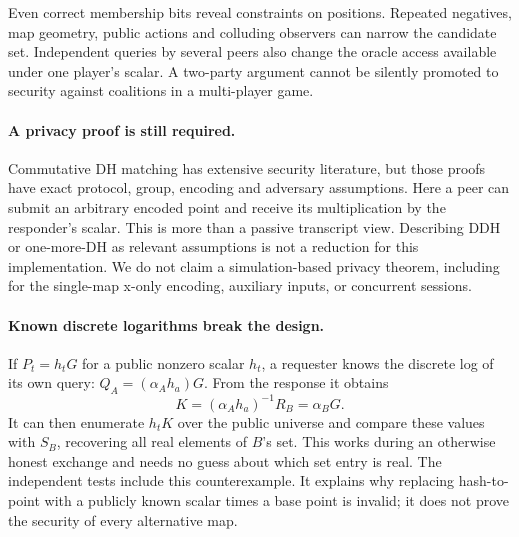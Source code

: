 \documentclass[11pt]{article}
\begin{document}
Even correct membership bits reveal constraints on positions. Repeated
negatives, map geometry, public actions and colluding observers can narrow the
candidate set. Independent queries by several peers also change the oracle
access available under one player's scalar. A two-party argument cannot be
silently promoted to security against coalitions in a multi-player game.

\paragraph{A privacy proof is still required.}
Commutative DH matching has extensive security literature, but those proofs
have exact protocol, group, encoding and adversary assumptions. Here a peer can
submit an arbitrary encoded point and receive its multiplication by the
responder's scalar. This is more than a passive transcript view. Describing
DDH or one-more-DH as relevant assumptions is not a reduction for this
implementation. We do not claim a simulation-based privacy theorem, including
for the single-map x-only encoding, auxiliary inputs, or concurrent sessions.

\paragraph{Known discrete logarithms break the design.}
If $P_t=h_tG$ for a public nonzero scalar $h_t$, a requester knows the discrete
log of its own query: $Q_A=(\alpha_A h_a)G$. From the response it obtains
\[
 K=(\alpha_A h_a)^{-1}R_B=\alpha_B G.
\]
It can then enumerate $h_tK$ over the public universe and compare these values
with $S_B$, recovering all real elements of $B$'s set. This works during an
otherwise honest exchange and needs no guess about which set entry is real.
The independent tests include this counterexample. It explains why replacing
hash-to-point with a publicly known scalar times a base point is invalid; it
does not prove the security of every alternative map.
\end{document}
